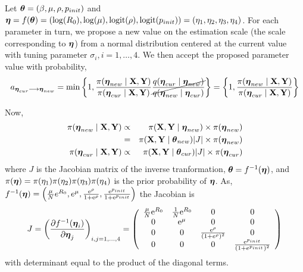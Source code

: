 Let $ \boldsymbol{\theta} = (\beta, \mu, \rho, p_{init}) $ and $ \boldsymbol{\eta} = f(\boldsymbol{\theta}) = \left (\log (R_0),\log (\mu), \mathrm{logit} (\rho), \mathrm{logit} (p_{init})\right ) = (\eta_1,\eta_2,\eta_3,\eta_4)$. For each parameter in turn, we propose a new value on the estimation scale (the scale corresponding to $ \boldsymbol{\eta} $) from a normal distribution centered at the current value with tuning parameter $ \sigma_i,i=1,\dots,4 $. We then accept the proposed parameter value with probability, \begin{equation*}
a_{\boldsymbol{\eta}_{cur}\longrightarrow \boldsymbol{\eta}_{new}} = \min\left \lbrace 1, \frac{\pi(\boldsymbol{\eta}_{new}\mid \mathbf{X}, \mathbf{Y})}{\pi(\boldsymbol{\eta}_{cur} \mid \mathbf{X}, \mathbf{Y})} \cancel{\frac{q(\boldsymbol{\eta}_{cur}\mid \boldsymbol{\eta}_{new})}{q(\boldsymbol{\eta}_{new} \mid \boldsymbol{\eta}_{cur})}}\right \rbrace = \left \lbrace 1, \frac{\pi(\boldsymbol{\eta}_{new}\mid \mathbf{X}, \mathbf{Y})}{\pi(\boldsymbol{\eta}_{cur} \mid \mathbf{X}, \mathbf{Y})} \right \rbrace
\end{equation*}

Now, \begin{eqnarray*}
\pi(\boldsymbol{\eta}_{new}\mid \mathbf{X},\mathbf{Y}) &\propto& \pi(\mathbf{X},\mathbf{Y} \mid \boldsymbol{\eta}_{new})\times \pi(\boldsymbol{\eta}_{new})\\
&=& \pi(\mathbf{X}, \mathbf{Y} \mid \boldsymbol{\theta}_{new}) |J|\times \pi(\boldsymbol{\eta}_{new})\\
\pi(\boldsymbol{\eta}_{cur}\mid\mathbf{X},\mathbf{Y}) &\propto &\pi(\mathbf{X}, \mathbf{Y} \mid \boldsymbol{\theta}_{cur}) |J|\times \pi(\boldsymbol{\eta}_{cur})
\end{eqnarray*}
where $ J $ is the Jacobian matrix of the inverse tranformation, $ \boldsymbol{\theta} = f^{-1}(\boldsymbol{\eta}) $,  and $ \pi(\boldsymbol{\eta}) = \pi(\eta_1)\pi(\eta_2)\pi(\eta_3)\pi(\eta_4) $ is the prior probability of $ \boldsymbol{\eta} $. As, $ f^{-1}(\boldsymbol{\eta}) = \left (\frac{\mu}{N}e^{R_0}, e^\mu, \frac{\mathrm{e}^{\rho}}{1+\mathrm{e}^\rho}, \frac{\mathrm{e}^{p_{init}}}{1+\mathrm{e}^{p_{init}}}\right ) $ the Jacobian is 
\begin{equation*}
J = \left (\frac{\partial f^{-1}(\boldsymbol{\eta}_i)}{\partial \boldsymbol{\eta}_j}\right )_{i,j = 1,\dots,4} = \left (\begin{array}{cccc}
\frac{\mu}{N}\mathrm{e}^{R_0} & \frac{1}{N}\mathrm{e}^{R_0} & 0 & 0\\
0 & \mathrm{e}^\mu & 0 & 0\\
0 & 0 & \frac{\mathrm{e}^\rho}{(1+e^\rho)^2} & 0\\
0 & 0& 0& \frac{\mathrm{e}^{p_{init}}}{(1+e^{p_{init}})^2}
\end{array}\right )
\end{equation*}
with determinant equal to the product of the diagonal terms.